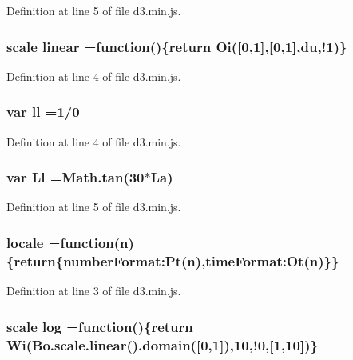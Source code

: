 Definition at line 5 of file d3.\+min.\+js.

\subsubsection[{linear}]{ {\bf scale} linear =function()\{{\bf return} {\bf Oi}([0,1],[0,1],{\bf du},!1)\}}\label{d3_8min_8js_a487729f0e5ccd345955939ffc768e44e}


Definition at line 4 of file d3.\+min.\+js.

\subsubsection[{ll}]{\setlength{\rightskip}{0pt plus 5cm}var ll =1/0}\label{d3_8min_8js_a47ed007be592ce4c1d2773e1495cd475}


Definition at line 4 of file d3.\+min.\+js.

\subsubsection[{Ll}]{\setlength{\rightskip}{0pt plus 5cm}var Ll =Math.\+tan(30$\ast${\bf La})}\label{d3_8min_8js_ad3169e913a3fadae2e6c72b3c180a243}


Definition at line 5 of file d3.\+min.\+js.

\subsubsection[{locale}]{ locale =function({\bf n})\{{\bf return}\{number\+Format\+:\+Pt({\bf n}),time\+Format\+:\+Ot({\bf n})\}\}}\label{d3_8min_8js_a369a58cd2e7c6afc66d91a15afac62e3}


Definition at line 3 of file d3.\+min.\+js.

\subsubsection[{log}]{ {\bf scale} log =function()\{{\bf return} {\bf Wi}({\bf Bo.\+scale.\+linear}().domain([0,1]),10,!0,[1,10])\}}\label{d3_8min_8js_ab7bcd347b10067b851dd2a04c06c85c5}



